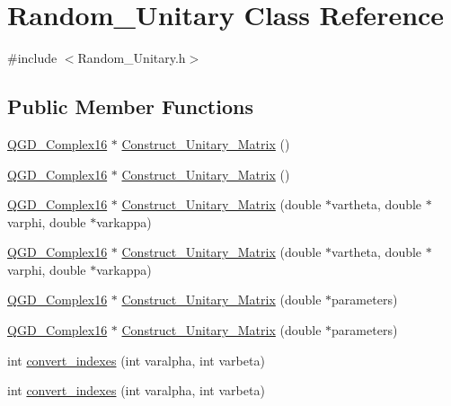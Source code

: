\hypertarget{class_random___unitary}{}\section{Random\+\_\+\+Unitary Class Reference}
\label{class_random___unitary}


{\ttfamily \#include $<$Random\+\_\+\+Unitary.\+h$>$}

\subsection*{Public Member Functions}
\begin{DoxyCompactItemize}
\item 
\hyperlink{struct_q_g_d___complex16}{Q\+G\+D\+\_\+\+Complex16} $\ast$ \hyperlink{class_random___unitary_ab02771b7201251866750d79c98a9ff22}{Construct\+\_\+\+Unitary\+\_\+\+Matrix} ()
\item 
\hyperlink{struct_q_g_d___complex16}{Q\+G\+D\+\_\+\+Complex16} $\ast$ \hyperlink{class_random___unitary_ae5953d8b46006211b7d81d5cdbd92122}{Construct\+\_\+\+Unitary\+\_\+\+Matrix} ()
\item 
\hyperlink{struct_q_g_d___complex16}{Q\+G\+D\+\_\+\+Complex16} $\ast$ \hyperlink{class_random___unitary_ace2ab5baafad04139f4ffc52c1174881}{Construct\+\_\+\+Unitary\+\_\+\+Matrix} (double $\ast$vartheta, double $\ast$varphi, double $\ast$varkappa)
\item 
\hyperlink{struct_q_g_d___complex16}{Q\+G\+D\+\_\+\+Complex16} $\ast$ \hyperlink{class_random___unitary_a005ca9750d5ecf057254b8f056b80251}{Construct\+\_\+\+Unitary\+\_\+\+Matrix} (double $\ast$vartheta, double $\ast$varphi, double $\ast$varkappa)
\item 
\hyperlink{struct_q_g_d___complex16}{Q\+G\+D\+\_\+\+Complex16} $\ast$ \hyperlink{class_random___unitary_ae46d7cdae00dcbe0a872014e2a331e90}{Construct\+\_\+\+Unitary\+\_\+\+Matrix} (double $\ast$parameters)
\item 
\hyperlink{struct_q_g_d___complex16}{Q\+G\+D\+\_\+\+Complex16} $\ast$ \hyperlink{class_random___unitary_a2d65369d746684ed1af412fa135d1690}{Construct\+\_\+\+Unitary\+\_\+\+Matrix} (double $\ast$parameters)
\item 
int \hyperlink{class_random___unitary_add356e845b1af5b0443302d9128b9392}{convert\+\_\+indexes} (int varalpha, int varbeta)
\item 
int \hyperlink{class_random___unitary_add356e845b1af5b0443302d9128b9392}{convert\+\_\+indexes} (int varalpha, int varbeta)

\end{DoxyCompactItemize}
